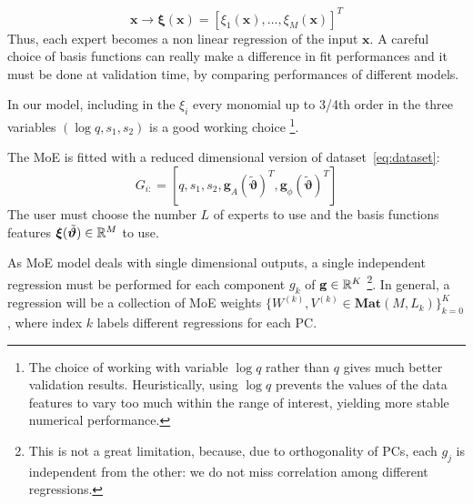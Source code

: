 \begin{equation}
	{\mathbf{x}} \longrightarrow {\boldsymbol{\xi}}({\mathbf{x}}) = [\xi_1({\mathbf{x}}), \ldots, \xi_M({\mathbf{x}})]^T
\end{equation}
Thus, each expert becomes a non linear regression of the input ${\mathbf{x}}$.
A careful choice of basis functions can really make a difference in fit performances and it must be done at validation time, by comparing performances of different models.
\par
In our model, including in the $\xi_i$ every monomial up to 3/4th order in the three variables $ (\log q, s_1, s_2)$ is a good working choice
\footnote{
The choice of working with variable $\log q$ rather than $q$ gives much better validation results.
Heuristically, using $\log q$ prevents the values of the data features to vary too much within the range of interest, yielding more stable numerical performance.
}.
\par
The MoE is fitted with a reduced dimensional version of dataset~\eqref{eq:dataset}:
\begin{equation} \label{eq:dataset_MoE}
	G_{i:} = [q,s_1,s_2, \mathbf{g}_{A}(\tilde{\boldsymbol{\vartheta}})^T, \mathbf{g}_{\phi}(\tilde{\boldsymbol{\vartheta}})^T]
\end{equation}
The user must choose the number $L$ of experts to use and the basis functions features ${\boldsymbol{\xi}}({\tilde{\boldsymbol{\vartheta}}}) \in \mathbb{R}^{M}$ to use.
\par
As MoE model deals with single dimensional outputs, a single independent regression must be performed for each component $g_k$ of $\mathbf{g} \in \mathbb{R}^K$
\footnote{This is not a great limitation, because, due to orthogonality of PCs, each $g_j$ is independent from the other: we do not miss correlation among different regressions.}.
In general, a regression will be a collection of MoE weights ${\{ W^{(k)}, V^{(k)} \in \mathbf{Mat}(M,L_k) \}_{k=0}^K}$, where index $k$ labels different regressions for each PC.


